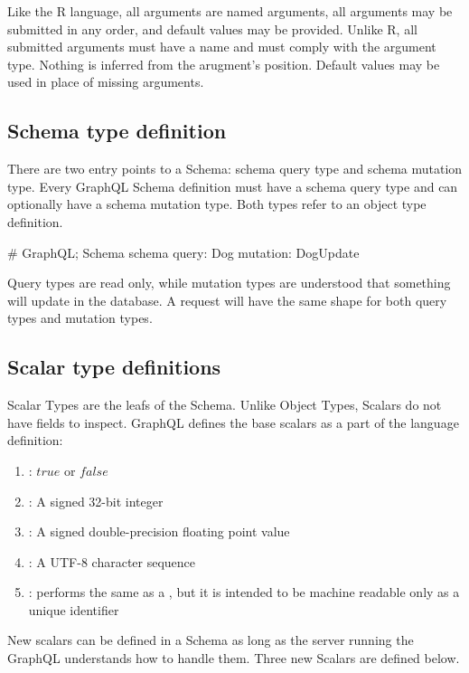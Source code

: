 \documentclass[stat,dissertation]{puthesis}\usepackage[]{graphicx}\usepackage{xcolor}
\begin{document}
Like the R language, all arguments are named arguments, all arguments may be submitted in any order, and default values may be provided.  Unlike R, all submitted arguments must have a name and must comply with the argument type.  Nothing is inferred from the arugment's position.  Default values may be used in place of missing arguments.

\subsection{Schema type definition}

There are two entry points to a Schema: schema query type and schema mutation type. Every GraphQL Schema definition must have a schema query type and can optionally have a schema mutation type.  Both types refer to an object type definition.

\begin{graphqlcode}
# GraphQL; Schema
schema {
  query: Dog
  mutation: DogUpdate
}
\end{graphqlcode}

Query types are read only, while mutation types are understood that something will update in the database.  A request will have the same shape for both query types and mutation types.

\subsection{Scalar type definitions}

Scalar Types are the leafs of the Schema.  Unlike Object Types, Scalars do not have fields to inspect.  GraphQL defines the base scalars as a part of the language definition:

\begin{enumerate}
  \item {}: $true$ or $false$
  \item {}: A signed 32-bit integer
  \item {}: A signed double-precision floating point value
  \item {}: A UTF-8 character sequence
  \item {}:  performs the same as a , but it is intended to be machine readable only as a unique identifier
\end{enumerate}

New scalars can be defined in a Schema as long as the server running the GraphQL understands how to handle them.  Three new Scalars are defined below.
\end{document}
